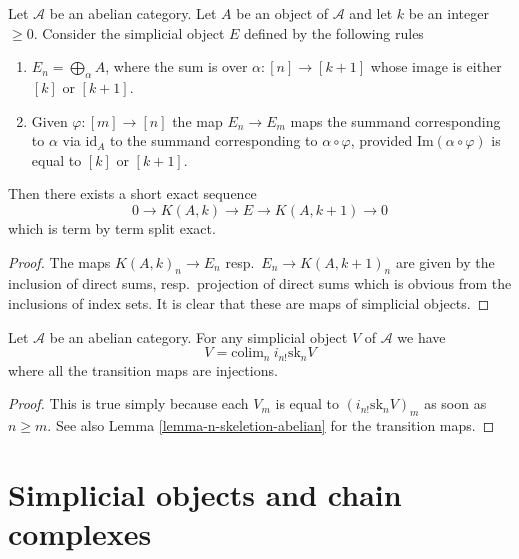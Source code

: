 \begin{lemma}
\label{lemma-extension}
Let $\mathcal{A}$ be an abelian category.
Let $A$ be an object of $\mathcal{A}$ and
let $k$ be an integer $\geq 0$. Consider the
simplicial object $E$ defined by the following rules
\begin{enumerate}
\item $E_n = \bigoplus_\alpha A$, where the
sum is over $\alpha : [n] \to [k + 1]$ whose
image is either $[k]$ or $[k + 1]$.
\item Given $\varphi : [m] \to [n]$ the map
$E_n \to E_m$ maps the summand corresponding
to $\alpha$ via $\text{id}_A$ to the summand
corresponding to $\alpha \circ \varphi$,
provided $\text{Im}(\alpha \circ \varphi)$
is equal to $[k]$ or $[k + 1]$.
\end{enumerate}
Then there exists a short exact sequence
$$
0 \to K(A, k) \to E \to K(A, k + 1) \to 0
$$
which is term by term split exact.
\end{lemma}

\begin{proof}
The maps $K(A, k)_n \to E_n$ resp.\ $E_n \to K(A, k + 1)_n$
are given by the inclusion of direct sums, resp.\ projection
of direct sums which is obvious from the inclusions of index
sets. It is clear that these are maps of simplicial
objects.
\end{proof}

\begin{lemma}
\label{lemma-abelian-limit-skeleta}
Let $\mathcal{A}$ be an abelian category.
For any simplicial object $V$ of $\mathcal{A}$ we have
$$
V = \text{colim}_n\ i_{n!}\text{sk}_n V
$$
where all the transition maps are injections.
\end{lemma}

\begin{proof}
This is true simply because each $V_m$ is
equal to $(i_{n!}\text{sk}_n V)_m$ as
soon as $n \geq m$. See also Lemma \ref{lemma-n-skeletion-abelian}
for the transition maps.
\end{proof}

\section{Simplicial objects and chain complexes}
\label{section-complexes}

